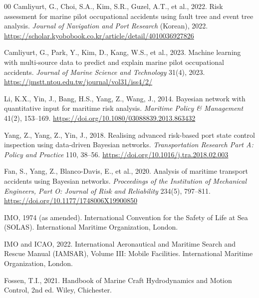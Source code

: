 \documentclass[preprint,12pt]{elsarticle}
\begin{document}
\begin{thebibliography}{00}
Camliyurt, G., Choi, S.A., Kim, S.R., Guzel, A.T., et al., 2022.
Risk assessment for marine pilot occupational accidents using fault tree and event tree analysis.
\emph{Journal of Navigation and Port Research} (Korean), 2022.
\url{https://scholar.kyobobook.co.kr/article/detail/4010036927826}

Camliyurt, G., Park, Y., Kim, D., Kang, W.S., et al., 2023.
Machine learning with multi-source data to predict and explain marine pilot occupational accidents.
\emph{Journal of Marine Science and Technology} 31(4), 2023.
\url{https://jmstt.ntou.edu.tw/journal/vol31/iss4/2/}

Li, K.X., Yin, J., Bang, H.S., Yang, Z., Wang, J., 2014.
Bayesian network with quantitative input for maritime risk analysis.
\emph{Maritime Policy \& Management} 41(2), 153--169.
\url{https://doi.org/10.1080/03088839.2013.863432}

Yang, Z., Yang, Z., Yin, J., 2018.
Realising advanced risk-based port state control inspection using data-driven Bayesian networks.
\emph{Transportation Research Part A: Policy and Practice} 110, 38--56.
\url{https://doi.org/10.1016/j.tra.2018.02.003}

Fan, S., Yang, Z., Blanco-Davis, E., et al., 2020.
Analysis of maritime transport accidents using Bayesian networks.
\emph{Proceedings of the Institution of Mechanical Engineers, Part O: Journal of Risk and Reliability} 234(5), 797--811.
\url{https://doi.org/10.1177/1748006X19900850}

IMO, 1974 (as amended).
International Convention for the Safety of Life at Sea (SOLAS).
International Maritime Organization, London.

IMO and ICAO, 2022.
International Aeronautical and Maritime Search and Rescue Manual (IAMSAR), Volume III: Mobile Facilities.
International Maritime Organization, London.

Fossen, T.I., 2021.
Handbook of Marine Craft Hydrodynamics and Motion Control, 2nd ed.
Wiley, Chichester.
\end{thebibliography}
\end{document}
